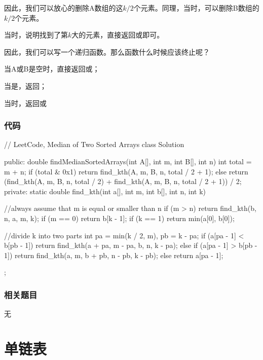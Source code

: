 因此，我们可以放心的删除A数组的这$k/2$个元素。同理，当时，可以删除B数组的$k/2$个元素。

当时，说明找到了第$k$大的元素，直接返回\fn{A[k/2-1}或\fn{B[k/2-1}即可。

因此，我们可以写一个递归函数。那么函数什么时候应该终止呢？
\begindot
\item 当A或B是空时，直接返回或；
\item 当是，返回；
\item 当时，返回\fn{A[k/2-1}或\fn{B[k/2-1}
\myenddot


\subsubsection{代码}
\begin{Code}
// LeetCode, Median of Two Sorted Arrays
class Solution {
public:
    double findMedianSortedArrays(int A[], int m, int B[], int n) {
        int total = m + n;
        if (total & 0x1)
            return find_kth(A, m, B, n, total / 2 + 1);
        else
            return (find_kth(A, m, B, n, total / 2)
                    + find_kth(A, m, B, n, total / 2 + 1)) / 2;
    }
private:
    static double find_kth(int a[], int m, int b[], int n, int k) {
        //always assume that m is equal or smaller than n
        if (m > n) return find_kth(b, n, a, m, k);
        if (m == 0) return b[k - 1];
        if (k == 1) return min(a[0], b[0]);

        //divide k into two parts
        int pa = min(k / 2, m), pb = k - pa;
        if (a[pa - 1] < b[pb - 1])
            return find_kth(a + pa, m - pa, b, n, k - pa);
        else if (a[pa - 1] > b[pb - 1])
            return find_kth(a, m, b + pb, n - pb, k - pb);
        else
            return a[pa - 1];
    }
};
\end{Code}


\subsubsection{相关题目}

\begindot
\item 无
\myenddot


\section{单链表} %

